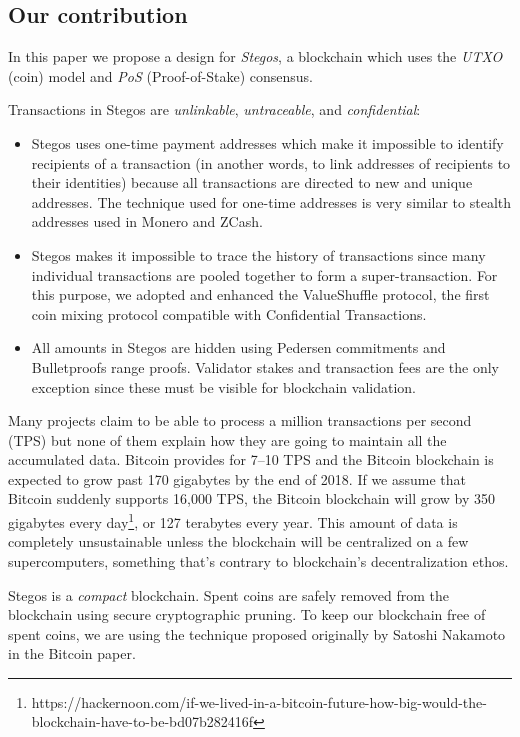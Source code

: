 \documentclass[a4paper, 10pt, conference]{ieeeconf}
\begin{document}
\subsection{Our contribution}
In this paper we propose a design for \textit{Stegos}, a blockchain which uses the \textit{UTXO} (coin) model and \textit{PoS} (Proof-of-Stake) consensus.

Transactions in Stegos are \textit{unlinkable}, \textit{untraceable}, and \textit{confidential}:

\begin{itemize}
	\item {Stegos uses one-time payment addresses which make it impossible to identify recipients of a transaction (in another words, to link addresses of recipients to their identities) because all transactions are directed to new and unique addresses. The technique used for one-time addresses is very similar to stealth addresses used in Monero and ZCash.}
	\item {Stegos makes it impossible to trace the history of transactions since many individual transactions are pooled together to form a super-transaction. For this purpose, we adopted and enhanced the ValueShuffle protocol\cite{c7}, the first coin mixing protocol compatible with Confidential Transactions.}
	\item {All amounts in Stegos are hidden using Pedersen commitments\cite{c8} and Bulletproofs range proofs\cite{c4}. Validator stakes and transaction fees are the only exception since these must be visible for blockchain validation.}
\end{itemize}

Many projects claim to be able to process a million transactions per second (TPS) but none of them explain how they are going to maintain all the accumulated data. Bitcoin provides for 7--10 TPS and the Bitcoin blockchain is expected to grow past 170 gigabytes by the end of 2018. If we assume that Bitcoin suddenly supports 16,000 TPS, the Bitcoin blockchain will grow by 350 gigabytes every day\footnote{https://hackernoon.com/if-we-lived-in-a-bitcoin-future-how-big-would-the-blockchain-have-to-be-bd07b282416f}, or 127 terabytes every year. This amount of data is completely unsustainable unless the blockchain will be centralized on a few supercomputers, something that’s contrary to blockchain’s decentralization ethos.

Stegos is a \textit{compact} blockchain. Spent coins are safely removed from the blockchain using secure cryptographic pruning. To keep our blockchain free of spent coins, we are using the technique proposed originally by Satoshi Nakamoto in the Bitcoin paper\cite{c1}.
\end{document}
